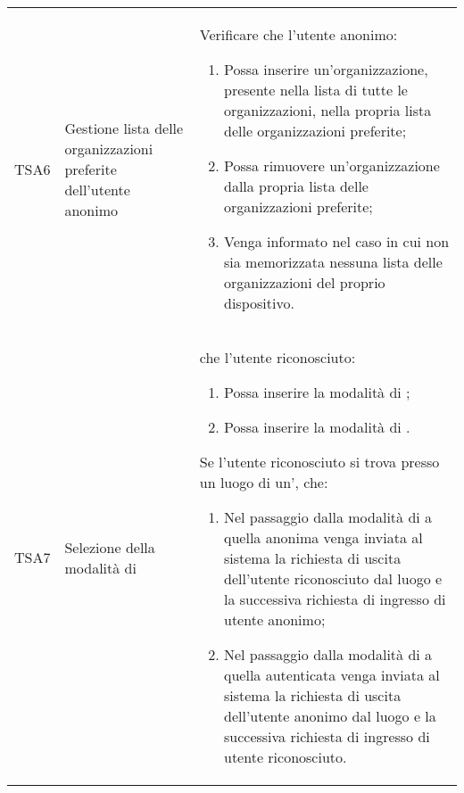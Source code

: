 {\begin{longtable}{ c  C{3cm}  C{11cm} }
TSA6 & Gestione lista delle organizzazioni preferite dell'utente anonimo &
Verificare che l'utente anonimo:
\begin{enumerate}
    \item Possa inserire un'organizzazione, presente nella lista di tutte le organizzazioni, nella propria lista delle organizzazioni preferite;
    \item Possa rimuovere un'organizzazione dalla propria lista delle organizzazioni preferite;
    \item Venga informato nel caso in cui non sia memorizzata nessuna lista delle organizzazioni del proprio dispositivo.
\end{enumerate} \\

TSA7 & Selezione della modalità di  & 
 che l'utente riconosciuto:
\begin{enumerate}
    \item Possa inserire la modalità di ;
    \item Possa inserire la modalità di .
\end{enumerate}
Se l'utente riconosciuto si trova presso un luogo di un',  che:
\begin{enumerate}
    \item Nel passaggio dalla modalità di  a quella anonima venga inviata al sistema la richiesta di uscita dell'utente riconosciuto dal luogo e la successiva richiesta di ingresso di utente anonimo;
    \item Nel passaggio dalla modalità di  a quella autenticata venga inviata al sistema la richiesta di uscita dell'utente anonimo dal luogo e la successiva richiesta di ingresso di utente riconosciuto.
\end{enumerate} \\


\end{longtable}}
